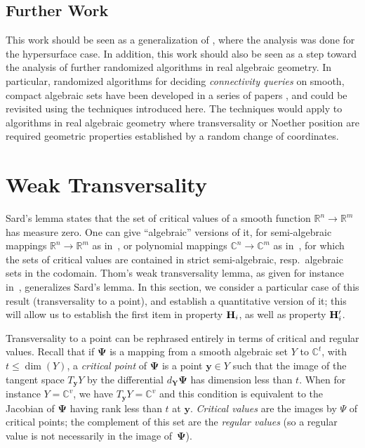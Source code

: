 \documentclass[a4paper]{article}
\def\C{\mathbb{C}}
\def\R{\mathbb{R}}
\begin{document}
\subsection{Further Work}
This work should be seen as a generalization of \cite{ElGiSh20}, where the analysis was done for the hypersurface case. In addition, this work should also be seen as a step toward the analysis of
further randomized algorithms in real algebraic geometry.  In particular, randomized algorithms for deciding {\em
  connectivity queries} on smooth, compact algebraic sets have been
developed in a series of papers
\cite{SchostMohabBabySteps2011,SchostMohabBabySteps2014}, and could be
revisited using the techniques introduced here. The techniques would apply to algorithms in real algebraic geometry where transversality or Noether position are required geometric properties established by a random change of coordinates. 



\section{Weak Transversality}
Sard's lemma states that the set of critical values of a smooth
function $\R^n \to \R^m$ has measure zero. One can give ``algebraic''
versions of it, for semi-algebraic mappings $\R^n \to \R^m$ as
in~\cite[Chapter~9]{bochnak1998real}, or polynomial mappings $\C^n \to
\C^m$ as in~\cite[Chapter~3]{Mumford76}, for which the sets of
critical values are contained in strict semi-algebraic,
resp.\ algebraic sets in the codomain. Thom's weak transversality
lemma, as given for instance in~\cite{demazure2000bifurcations},
generalizes Sard's lemma. In this section, we consider a particular
case of this result (transversality to a point), and establish a
quantitative version of it; this will allow us to establish the first
item in property ${\bf H}_i$, as well as property ${\bf H}'_i$. 



Transversality to a point can be rephrased entirely in terms of
critical and regular values. Recall that if $\bm \Psi$ is a mapping
from a smooth algebraic set $Y$ to $\C^t$, with $t\le \dim(Y)$, a {\em
  critical point} of $\bm \Psi$ is a point $\bm y \in Y$ such that the
image of the tangent space $T_{\bm y} Y$ by the differential $d_{\bm
  Y} \bm \Psi$ has dimension less than $t$. When for instance
$Y=\C^v$, we have $T_{\bm y} Y=\C^v$ and this condition is equivalent
to the Jacobian of $\bm \Psi$ having rank less than $t$ at $\bm y$.
{\em Critical values} are the images by $\Psi$ of critical points; the
complement of this set are the {\em regular values} (so a regular
value is not necessarily in the image of~$\bm\Psi$).
\end{document}
